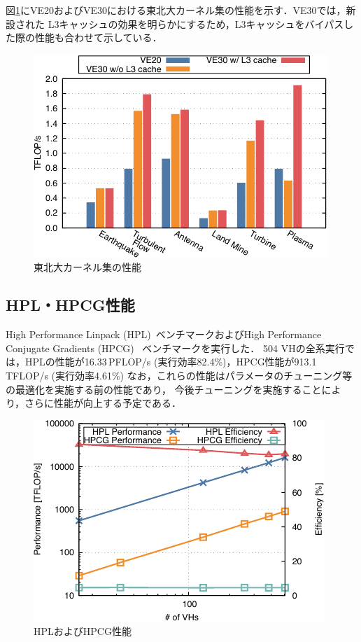 ﻿\documentclass[submit,techrep,noauthor]{ipsj}
\begin{document}
図\ref{fig:isc-kernels}にVE20およびVE30における東北大カーネル集の性能を示す．VE30では，新設された
L3キャッシュの効果を明らかにするため，L3キャッシュをバイパスした際の性能も合わせて示している．

\begin{figure}[tb]
  \centering
  \includegraphics{figs/isc_kernels.pdf}
  \caption{東北大カーネル集の性能}\label{fig:isc-kernels}
\end{figure}

\subsection{HPL・HPCG性能}\label{sec:hpl-hpcg}

High Performance Linpack (HPL)~\cite{Dongarra2003}ベンチマークおよびHigh Performance Conjugate
Gradients (HPCG)~\cite{Dongarra2016} ベンチマークを実行した．
504 VHの全系実行では，HPLの性能が16.33\,PFLOP/s (実行効率82.4\%)，HPCG性能が913.1\,TFLOP/s 
(実行効率4.61\%) なお，これらの性能はパラメータのチューニング等の最適化を実施する前の性能であり，
今後チューニングを実施することにより，さらに性能が向上する予定である．

\begin{figure}[tb]
  \centering
  \includegraphics{figs/hpl_hpcg.pdf}
  \caption{HPLおよびHPCG性能}\label{fig:hpl-hpcg}
\end{figure}
\end{document}
